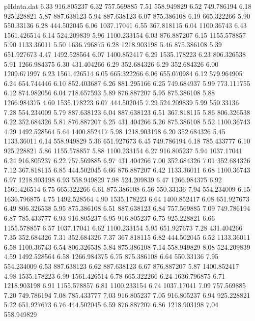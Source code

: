 \begin{filecontents}{pHdata.dat}
6.33 	916.805237
6.32 	757.569885
7.51 	558.949829
6.52 	749.786194
6.18 	925.228821
5.87 	887.638123
5.94 	887.638123
6.07 	875.386108
6.19 	665.322266
5.90 	550.33136
6.28 	444.502045
6.06 	1037.17041
6.55 	367.818115
6.04 	1100.36743
6.43 	1561.426514
6.14 	524.209839
5.96 	1100.233154
6.03 	876.887207
6.15 	1155.578857
5.90 	1133.36011
5.50 	1636.796875
6.28 	1218.903198
5.46 	875.386108
5.39 	651.927673
4.47 	1492.528564
6.07 	1400.852417
6.29 	1535.178223
6.23 	806.326538
5.91 	1266.984375
6.30 	431.404266
6.29 	352.684326
6.29 	352.684326
6.00 	1209.671997
6.23 	1561.426514
6.05 	665.322266
6.06 	655.070984
6.12 	579.964905
6.24 	654.744446
6.10 	852.403687
6.26 	881.295166
6.25 	749.684937
5.99 	773.111755
6.12 	874.982056
6.04 	718.657593
5.89 	876.887207
5.95 	875.386108
5.88 	1266.984375
4.60 	1535.178223
6.07 	444.502045
7.29 	524.209839
5.99 	550.33136
7.28 	554.234009
5.79 	887.638123
6.04 	887.638123
6.51 	367.818115
5.86 	806.326538
6.22 	352.684326
5.81 	876.887207
6.25 	431.404266
5.26 	875.386108
5.52 	1100.36743
4.29 	1492.528564
5.64 	1400.852417
5.98 	1218.903198
6.20 	352.684326
5.45 	1133.36011
6.14 	558.949829
5.36 	651.927673
6.45 	749.786194
6.18 	785.433777
6.10 	925.228821
5.86 	1155.578857
5.88 	1100.233154
6.27 	916.805237
5.94 	1037.17041
6.24 	916.805237
6.22 	757.569885
6.97 	431.404266
7.00 	352.684326
7.01 	352.684326
7.12 	367.818115
6.85 	444.502045
6.66 	876.887207
6.42 	1133.36011
6.68 	1100.36743
6.97 	1218.903198
6.93 	558.949829
7.98 	524.209839
6.47 	1266.984375
6.92 	1561.426514
6.75 	665.322266
6.61 	875.386108
6.56 	550.33136
7.94 	554.234009
6.15 	1636.796875
4.75 	1492.528564
4.90 	1535.178223
6.64 	1400.852417
6.08 	651.927673
6.49 	806.326538
5.95 	875.386108
6.51 	887.638123
6.84 	757.569885
7.09 	749.786194
6.87 	785.433777
6.93 	916.805237
6.95 	916.805237
6.75 	925.228821
6.66 	1155.578857
6.57 	1037.17041
6.62 	1100.233154
5.95 	651.927673
7.28 	431.404266
7.35 	352.684326
7.31 	352.684326
7.37 	367.818115
6.82 	444.502045
6.52 	1133.36011
6.58 	1100.36743
6.54 	806.326538
5.84 	875.386108
7.14 	558.949829
8.08 	524.209839
4.59 	1492.528564
6.58 	1266.984375
6.75 	875.386108
6.64 	550.33136
7.95 	554.234009
6.53 	887.638123
6.62 	887.638123
6.67 	876.887207
5.87 	1400.852417
4.98 	1535.178223
6.99 	1561.426514
6.78 	665.322266
6.24 	1636.796875
6.71 	1218.903198
6.91 	1155.578857
6.81 	1100.233154
6.74 	1037.17041
7.09 	757.569885
7.20 	749.786194
7.08 	785.433777
7.03 	916.805237
7.05 	916.805237
6.94 	925.228821
5.22 	651.927673
6.76 	444.502045
6.59 	876.887207
6.86 	1218.903198
7.04 	558.949829

\end{filecontents}
